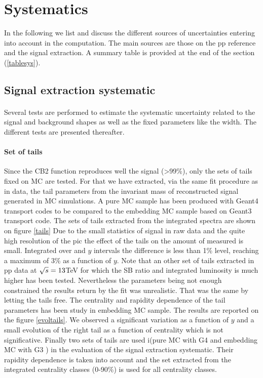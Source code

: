 \graphicspath{{Figures/Systematics/}}

\section{Systematics}

In the following we list and discuss the different sources of uncertainties entering into account in the \Raa computation. 
The main sources are those on the pp reference and the signal extraction.
A summary table is provided at the end of the section (\ref{tablesys}).

\subsection{Signal extraction systematic} \label{sysSigExtr}

\paragraph{}
Several tests are performed to estimate the systematic uncertainty related to the signal and background shapes as well as the fixed parameters like the \upsp width.
The different tests are presented thereafter.
 
\paragraph{Set of tails}
Since the CB2 function reproduces well the signal (>99\%), only the sets of tails fixed on MC are tested.
For that we have extracted, via the same fit procedure as in data, the tail parameters from the invariant mass of reconstructed \ups signal generated in MC simulations.
A pure \ups MC sample has been produced with Geant4 transport codes to be compared to the embedding MC sample based on Geant3 transport code.
The sets of tails extracted from the integrated spectra are shown on figure \ref{tails}
Due to the small statistics of signal in raw data and the quite high resolution of the pic the effect of the tails on the amount of measured \ups is small.
Integrated over \pt and $y$ intervals the difference is less than 1\% level, reaching a maximum of 3\% as a function of $y$.
Note that an other set of tails extracted in pp data at $\sqrt{s}=13$\;TeV for which the S\/B ratio and integrated luminosity is much higher has been tested.
Nevertheless the parameters being not enough constrained the results return by the fit was unrealistic.
That was the same by letting the tails free.
The centrality and rapidity dependence of the tail parameters has been study in embedding MC sample.
The results are reported on the figure \ref{evoltails}.
We observed a significant variation as a function of $y$ and a small evolution of the right tail as a function of centrality which is not significative.
Finally two sets of tails are used i(pure \ups MC with G4 and embedding MC with G3 ) in the evaluation of the signal extraction systematic.
Their rapidity dependence is taken into account and the set extracted from the integrated centrality classes (0-90\%) is used for all centrality classes.


